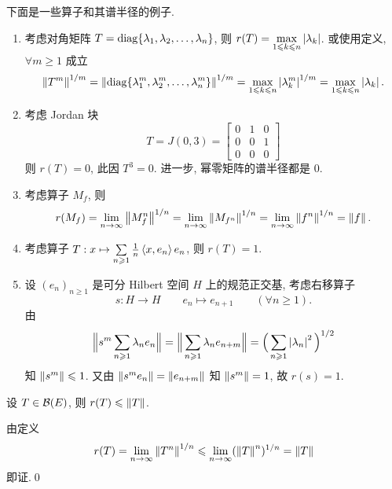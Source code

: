     \begin{Example}
        下面是一些算子和其谱半径的例子.
        \begin{enumerate}[(1)]
            \item 考虑对角矩阵 $ T=\operatorname{diag}\{ \lambda_{1}, \lambda_{2}, \dots, \lambda_{n} \} $, 则 $ r(T)=\max\limits_{1\leqslant k\leqslant n}\left| \lambda_{k} \right|  $. 或使用定义, $ \forall m\geqslant1 $ 成立
            \[
                \left\| T^{m} \right\|^{1/m}=\left\| \operatorname{diag}\{ \lambda^{m}_{1}, \lambda^{m}_{2}, \dots, \lambda^{m}_{n} \} \right\|^{1/m}=\max_{1\leqslant k\leqslant n}\left| \lambda_{k}^{m} \right| ^{1/m}=\max_{1\leqslant k\leqslant n}\left| \lambda_{k} \right| .
            \]
            \item 考虑 Jordan 块
            \[
                T = J(0, 3)=\begin{bmatrix}
                    0 & 1 & 0\\
                    0 & 0 & 1\\
                    0 & 0 & 0
                \end{bmatrix}
            \]
            则 $ r(T)=0 $, 此因 $ T^{3}=0 $. 进一步, 幂零矩阵的谱半径都是 0.
            \item 考虑算子 $ M_{f} $, 则
            \[
                r(M_{f}) = \lim_{n\to\infty}\left\| M_{f}^{n} \right\|^{1/n}=\lim_{n\to\infty}\left\| M_{f^{n}} \right\|^{1/n}=\lim_{n\to\infty}\left\| f^{n} \right\|^{1/n}=\left\| f \right\|.
            \]
            \item 考虑算子 $ T: x\mapsto\sum\limits_{n\geqslant1}\frac{1}{n}\left\langle x, e_{n} \right\rangle e_{n} $, 则 $ r(T)=1 $.
            \item 设 $ (e_{n})_{n\geqslant1} $ 是可分 Hilbert 空间 $ H $ 上的规范正交基, 考虑右移算子
            \[
                s: H\to H\qquad e_{n}\mapsto e_{n+1}\qquad (\forall n\geqslant1).
            \]
            由
            \[
                \Big\| s^{m}\sum_{n\geqslant1}\lambda_{n}e_{n} \Big\|=\Big\| \sum_{n\geqslant1}\lambda_{n}e_{n+m} \Big\|=\Big( \sum_{n\geqslant1}\left| \lambda_{n} \right| ^{2} \Big)^{1/2}
            \]
            知 $ \left\| s^{m} \right\|\leqslant1 $. 又由 $ \left\| s^{m}e_{n} \right\|=\left\| e_{n+m} \right\| $ 知 $ \left\| s^{m} \right\|=1 $, 故 $ r(s)=1 $.
        \end{enumerate}
    \end{Example}

    \begin{Corollary}
        设 $ T\in\mathcal{B}(E) $, 则 $ r(T)\leqslant\left\| T \right\| $.
    \end{Corollary}
    \begin{Proof}
        由定义
        \[
            r(T)=\lim_{n\to\infty}\left\| T^{n} \right\|^{1/n}\leqslant\lim_{n\to\infty}(\left\| T \right\|^{n})^{1/n}=\left\| T \right\|
        \]
        即证.\qed
    \end{Proof}

